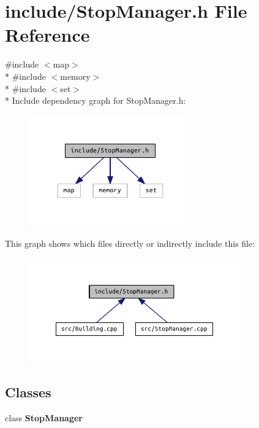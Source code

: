 \section{include/\+Stop\+Manager.h File Reference}
\label{_stop_manager_8h}
{\ttfamily \#include $<$map$>$}\\*
{\ttfamily \#include $<$memory$>$}\\*
{\ttfamily \#include $<$set$>$}\\*
Include dependency graph for Stop\+Manager.\+h\+:
\nopagebreak
\begin{figure}[H]
\begin{center}
\leavevmode
\includegraphics[width=198pt]{_stop_manager_8h__incl}
\end{center}
\end{figure}
This graph shows which files directly or indirectly include this file\+:
\nopagebreak
\begin{figure}[H]
\begin{center}
\leavevmode
\includegraphics[width=258pt]{_stop_manager_8h__dep__incl}
\end{center}
\end{figure}
\subsection*{Classes}
\begin{DoxyCompactItemize}
\item 
class {\bf Stop\+Manager}
\end{DoxyCompactItemize}
